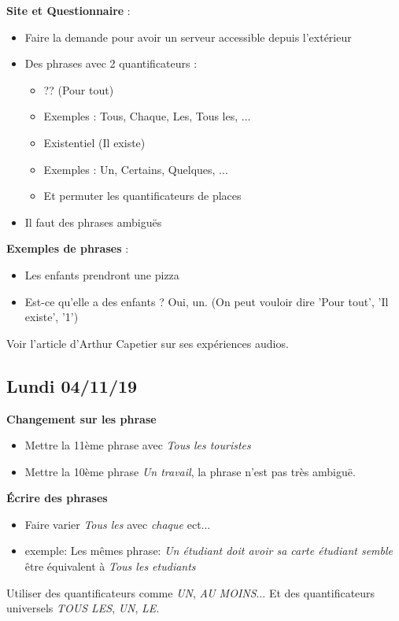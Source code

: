 \documentclass[11pt,letterpaper]{article}
\begin{document}
\textbf{Site et Questionnaire} :
\begin{itemize}
    \item Faire la demande pour avoir un serveur accessible depuis l'extérieur
        
    \item Des phrases avec 2 quantificateurs :
    \begin{itemize}
        \item ?? (Pour tout)
        \item Exemples : Tous, Chaque, Les, Tous les, ...
        \item Existentiel (Il existe)
        \item Exemples : Un, Certains, Quelques, ...
        \item Et permuter les quantificateurs de places
    \end{itemize}
    \item Il faut des phrases ambiguës
\end{itemize} \vspace{5mm}

\textbf{Exemples de phrases} :
\begin{itemize}
    \item Les enfants prendront une pizza
    \item Est-ce qu'elle a des enfants ? Oui, un. (On peut vouloir dire 'Pour tout', 'Il existe', '1')
\end{itemize} \vspace{5mm}

Voir l'article d'Arthur Capetier sur ses expériences audios. \vspace{5mm}

\newpage
\subsection{Lundi 04/11/19}

\textbf{Changement sur les phrase}

\begin{itemize}
    \item Mettre la 11ème phrase avec \textit{Tous les touristes}
    \item Mettre la 10ème phrase \textit{Un travail}, la phrase n'est pas très ambiguë.
\end{itemize} 

\vspace{5mm}
\textbf{Écrire des phrases}
\begin{itemize}
    \item Faire varier \textit{Tous les} avec \textit{chaque} ect...
    \item exemple: Les mêmes phrase: \textit{Un étudiant doit avoir sa carte étudiant semble} être équivalent à \textit{Tous les etudiants}
\end{itemize}
Utiliser des quantificateurs comme \textit{UN}, \textit{AU MOINS}... Et des quantificateurs universels \textit{TOUS LES}, \textit{UN}, \textit{LE}.
\end{document}
